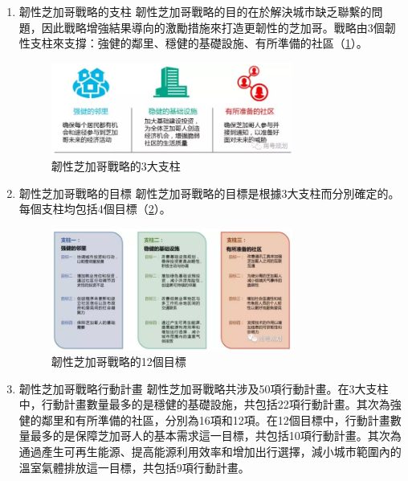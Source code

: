 \documentclass[a4paper,12pt]{article}
\begin{document}
\begin{enumerate}
\begin{enumerate}
\item 韌性芝加哥戰略的支柱
\label{sec:orgb46dfb3}
韌性芝加哥戰略的目的在於解決城市缺乏聯繫的問題，因此戰略增強結果導向的激勵措施來打造更韌性的芝加哥。戰略由3個韌性支柱來支撐：強健的鄰里、穩健的基礎設施、有所準備的社區（\ref{fig:Chicago-3}）。\\
\begin{figure}[htbp]
\centering
\includegraphics[width=300]{images/2021-03-24_15-18-13.jpg}
\caption{\label{fig:Chicago-3}韌性芝加哥戰略的3大支柱}
\end{figure}

\item 韌性芝加哥戰略的目標
\label{sec:orgd48a1e6}
韌性芝加哥戰略的目標是根據3大支柱而分別確定的。每個支柱均包括4個目標（\ref{fig:Chicago-4}）。\\
\begin{figure}[htbp]
\centering
\includegraphics[width=300]{images/2021-03-24_15-19-25.jpg}
\caption{\label{fig:Chicago-4}韌性芝加哥戰略的12個目標}
\end{figure}

\item 韌性芝加哥戰略行動計畫
\label{sec:orga8e2ddb}
韌性芝加哥戰略共涉及50項行動計畫。在3大支柱中，行動計畫數量最多的是穩健的基礎設施，共包括22項行動計畫。其次為強健的鄰里和有所準備的社區，分別為16項和12項。在12個目標中，行動計畫數量最多的是保障芝加哥人的基本需求這一目標，共包括10項行動計畫。其次為通過產生可再生能源、提高能源利用效率和增加出行選擇，減小城市範圍內的溫室氣體排放這一目標，共包括9項行動計畫。\\
\end{enumerate}


\end{enumerate}
\end{document}
